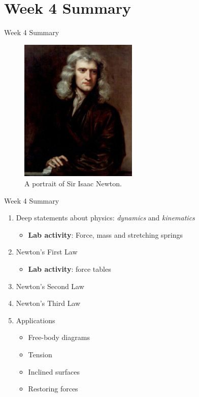 \documentclass{beamer}
\begin{document}
\section{Week 4 Summary}

\begin{frame}{Week 4 Summary}
\begin{figure}
\centering
\includegraphics[width=0.5\textwidth]{figures/newton.png}
\caption{\label{fig:newton} A portrait of Sir Isaac Newton.}
\end{figure}
\end{frame}

\begin{frame}{Week 4 Summary}
\begin{enumerate}
\item Deep statements about physics: \textit{dynamics} and \textit{kinematics}
\begin{itemize}
\item \textbf{Lab activity}: Force, mass and stretching springs
\end{itemize}
\item Newton's \alert{First Law}
\begin{itemize}
\item \textbf{Lab activity}: force tables
\end{itemize}
\item Newton's \alert{Second Law}
\item Newton's \alert{Third Law}
\item Applications
\begin{itemize}
\item Free-body diagrams
\item Tension
\item Inclined surfaces
\item Restoring forces
\end{itemize}
\end{enumerate}
\end{frame}
\end{document}
